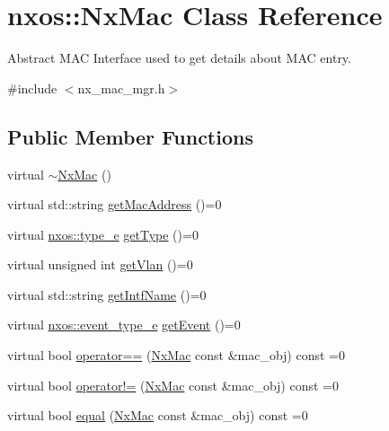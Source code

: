 \hypertarget{classnxos_1_1_nx_mac}{}\section{nxos\+:\+:Nx\+Mac Class Reference}
\label{classnxos_1_1_nx_mac}


Abstract M\+AC Interface used to get details about M\+AC entry.  




{\ttfamily \#include $<$nx\+\_\+mac\+\_\+mgr.\+h$>$}

\subsection*{Public Member Functions}
\begin{DoxyCompactItemize}
\item 
virtual \mbox{\hyperlink{classnxos_1_1_nx_mac_a54a2228786abb8df6429123aa39795cb}{$\sim$\+Nx\+Mac}} ()
\item 
virtual std\+::string \mbox{\hyperlink{classnxos_1_1_nx_mac_ae1510492e7d8fe257f918c74bbe6b0ea}{get\+Mac\+Address}} ()=0
\item 
virtual \mbox{\hyperlink{nx__common_8h_acfd59f63fea0b34d70c39b7e808cb5d2}{nxos\+::type\+\_\+e}} \mbox{\hyperlink{classnxos_1_1_nx_mac_a4cf7307522c86006f61a7c106843762a}{get\+Type}} ()=0
\item 
virtual unsigned int \mbox{\hyperlink{classnxos_1_1_nx_mac_ab785cecf1661f3c30c96fe952ba410f3}{get\+Vlan}} ()=0
\item 
virtual std\+::string \mbox{\hyperlink{classnxos_1_1_nx_mac_a4d29913106ccffd03fbd93fed04129eb}{get\+Intf\+Name}} ()=0
\item 
virtual \mbox{\hyperlink{nx__common_8h_af9a9040b7681199d386e94eb888018cb}{nxos\+::event\+\_\+type\+\_\+e}} \mbox{\hyperlink{classnxos_1_1_nx_mac_a78876af7dfe79a990ea9eacc6f6dd078}{get\+Event}} ()=0
\item 
virtual bool \mbox{\hyperlink{classnxos_1_1_nx_mac_ae6ebe78a6679fb460e2ed1f18c08acd0}{operator==}} (\mbox{\hyperlink{classnxos_1_1_nx_mac}{Nx\+Mac}} const \&mac\+\_\+obj) const =0
\item 
virtual bool \mbox{\hyperlink{classnxos_1_1_nx_mac_a11e241f495e5f2a00b6782b3f5416237}{operator!=}} (\mbox{\hyperlink{classnxos_1_1_nx_mac}{Nx\+Mac}} const \&mac\+\_\+obj) const =0
\item 
virtual bool \mbox{\hyperlink{classnxos_1_1_nx_mac_a9a4529b39d875b2dd54b0208d1a61c1a}{equal}} (\mbox{\hyperlink{classnxos_1_1_nx_mac}{Nx\+Mac}} const \&mac\+\_\+obj) const =0
\end{DoxyCompactItemize}


